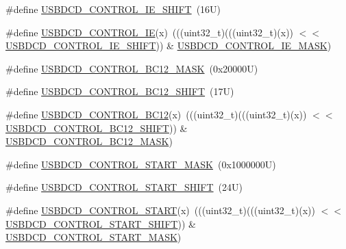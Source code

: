\begin{DoxyCompactItemize}
\item 
\#define \mbox{\hyperlink{group___u_s_b_d_c_d___register___masks_ga33f53d29349cc16bb002486da4472ece}{U\+S\+B\+D\+C\+D\+\_\+\+C\+O\+N\+T\+R\+O\+L\+\_\+\+I\+E\+\_\+\+S\+H\+I\+FT}}~(16\+U)
\item 
\#define \mbox{\hyperlink{group___u_s_b_d_c_d___register___masks_ga24296ed435a398841cc316916c246d5e}{U\+S\+B\+D\+C\+D\+\_\+\+C\+O\+N\+T\+R\+O\+L\+\_\+\+IE}}(x)~(((uint32\+\_\+t)(((uint32\+\_\+t)(x)) $<$$<$ \mbox{\hyperlink{group___u_s_b_d_c_d___register___masks_ga33f53d29349cc16bb002486da4472ece}{U\+S\+B\+D\+C\+D\+\_\+\+C\+O\+N\+T\+R\+O\+L\+\_\+\+I\+E\+\_\+\+S\+H\+I\+FT}})) \& \mbox{\hyperlink{group___u_s_b_d_c_d___register___masks_ga44f183d0863aeac1154727de57ee6fb6}{U\+S\+B\+D\+C\+D\+\_\+\+C\+O\+N\+T\+R\+O\+L\+\_\+\+I\+E\+\_\+\+M\+A\+SK}})
\item 
\#define \mbox{\hyperlink{group___u_s_b_d_c_d___register___masks_ga55366a87bd0cbbbdb98b889e603ff98b}{U\+S\+B\+D\+C\+D\+\_\+\+C\+O\+N\+T\+R\+O\+L\+\_\+\+B\+C12\+\_\+\+M\+A\+SK}}~(0x20000\+U)
\item 
\#define \mbox{\hyperlink{group___u_s_b_d_c_d___register___masks_ga156a178bc13853a3d4fc1feef734734e}{U\+S\+B\+D\+C\+D\+\_\+\+C\+O\+N\+T\+R\+O\+L\+\_\+\+B\+C12\+\_\+\+S\+H\+I\+FT}}~(17\+U)
\item 
\#define \mbox{\hyperlink{group___u_s_b_d_c_d___register___masks_ga4ebaf436d02214dfbcc5ec5980a1c354}{U\+S\+B\+D\+C\+D\+\_\+\+C\+O\+N\+T\+R\+O\+L\+\_\+\+B\+C12}}(x)~(((uint32\+\_\+t)(((uint32\+\_\+t)(x)) $<$$<$ \mbox{\hyperlink{group___u_s_b_d_c_d___register___masks_ga156a178bc13853a3d4fc1feef734734e}{U\+S\+B\+D\+C\+D\+\_\+\+C\+O\+N\+T\+R\+O\+L\+\_\+\+B\+C12\+\_\+\+S\+H\+I\+FT}})) \& \mbox{\hyperlink{group___u_s_b_d_c_d___register___masks_ga55366a87bd0cbbbdb98b889e603ff98b}{U\+S\+B\+D\+C\+D\+\_\+\+C\+O\+N\+T\+R\+O\+L\+\_\+\+B\+C12\+\_\+\+M\+A\+SK}})
\item 
\#define \mbox{\hyperlink{group___u_s_b_d_c_d___register___masks_ga02bb74c9b2d9fd907d02b72ec4f2dc0c}{U\+S\+B\+D\+C\+D\+\_\+\+C\+O\+N\+T\+R\+O\+L\+\_\+\+S\+T\+A\+R\+T\+\_\+\+M\+A\+SK}}~(0x1000000\+U)
\item 
\#define \mbox{\hyperlink{group___u_s_b_d_c_d___register___masks_ga8a353cada7464a5898998c45b2caabb5}{U\+S\+B\+D\+C\+D\+\_\+\+C\+O\+N\+T\+R\+O\+L\+\_\+\+S\+T\+A\+R\+T\+\_\+\+S\+H\+I\+FT}}~(24\+U)
\item 
\#define \mbox{\hyperlink{group___u_s_b_d_c_d___register___masks_gad40b028fc09a1ed757d15b659dd34dd2}{U\+S\+B\+D\+C\+D\+\_\+\+C\+O\+N\+T\+R\+O\+L\+\_\+\+S\+T\+A\+RT}}(x)~(((uint32\+\_\+t)(((uint32\+\_\+t)(x)) $<$$<$ \mbox{\hyperlink{group___u_s_b_d_c_d___register___masks_ga8a353cada7464a5898998c45b2caabb5}{U\+S\+B\+D\+C\+D\+\_\+\+C\+O\+N\+T\+R\+O\+L\+\_\+\+S\+T\+A\+R\+T\+\_\+\+S\+H\+I\+FT}})) \& \mbox{\hyperlink{group___u_s_b_d_c_d___register___masks_ga02bb74c9b2d9fd907d02b72ec4f2dc0c}{U\+S\+B\+D\+C\+D\+\_\+\+C\+O\+N\+T\+R\+O\+L\+\_\+\+S\+T\+A\+R\+T\+\_\+\+M\+A\+SK}})
$$
\end{DoxyCompactItemize}

